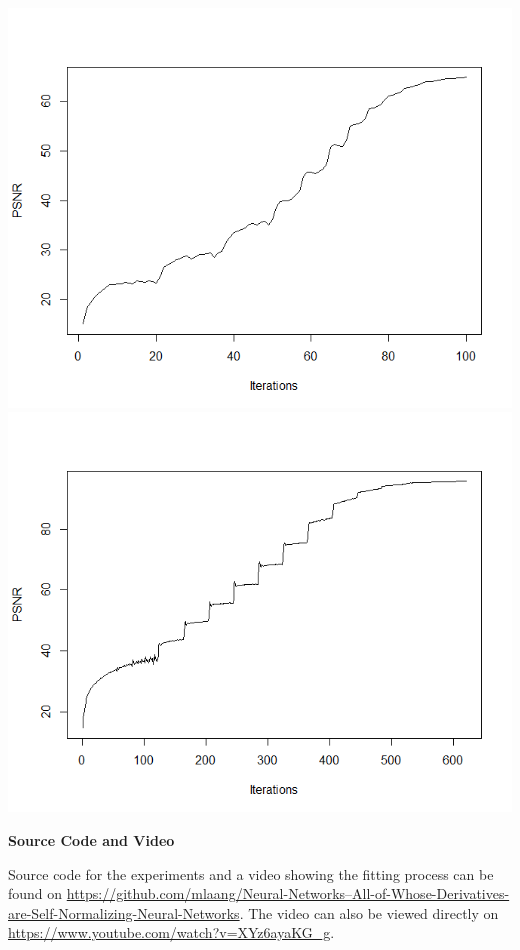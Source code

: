 \documentclass{letter}
\begin{document}
\includegraphics[scale=0.4]{PSNR-with-aggressive-training.png} \includegraphics[scale=0.4]{PSNR-with-less-aggressive-training.png}

\begin{center}
{\bf Source Code and Video}
\end{center}

Source code for the experiments and a video showing the fitting process can be found on \href{https://github.com/mlaang/Neural-Networks--All-of-Whose-Derivatives-are-Self-Normalizing-Neural-Networks}{https://github.com/mlaang/Neural-Networks--All-of-Whose-Derivatives-are-Self-Normalizing-Neural-Networks}. The video can also be viewed directly on \href{https://www.youtube.com/watch?v=XYz6ayaKG_g}{https://www.youtube.com/watch?v=XYz6ayaKG\_g}.
\end{document}
